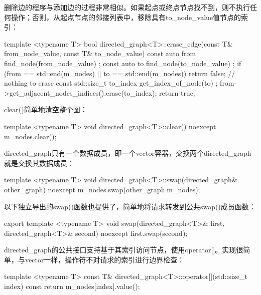 
删除边的程序与添加边的过程非常相似。如果起点或终点节点找不到，则不执行任何操作；否则，从起点节点的邻接列表中，移除具有to\_node\_value值节点的索引：

\begin{cpp}
template <typename T>
bool directed_graph<T>::erase_edge(const T& from_node_value,
const T& to_node_value)
{
    const auto from { find_node(from_node_value) };
    const auto to { find_node(to_node_value) };
    if (from == std::end(m_nodes) || to == std::end(m_nodes)) {
        return false; // nothing to erase
    }
    const std::size_t to_index { get_index_of_node(to) };
    from->get_adjacent_nodes_indices().erase(to_index);
    return true;
}
\end{cpp}


clear()简单地清空整个图：

\begin{cpp}
template <typename T>
void directed_graph<T>::clear() noexcept
{
    m_nodes.clear();
}
\end{cpp}


directed\_graph只有一个数据成员，即一个vector容器，交换两个directed\_graph就是交换其数据成员：

\begin{cpp}
template <typename T>
void directed_graph<T>::swap(directed_graph& other_graph) noexcept
{
    m_nodes.swap(other_graph.m_nodes);
}
\end{cpp}

以下独立导出的swap()函数也提供了，简单地将请求转发到公共swap()成员函数：

\begin{cpp}
export template <typename T>
void swap(directed_graph<T>& first, directed_graph<T>& second) noexcept
{
    first.swap(second);
}
\end{cpp}


directed\_graph的公共接口支持基于其索引访问节点，使用operator[]。实现很简单，与vector一样，操作符不对请求的索引进行边界检查：

\begin{cpp}
template <typename T>
const T& directed_graph<T>::operator[](std::size_t index) const
{
    return m_nodes[index].value();
}
\end{cpp}


